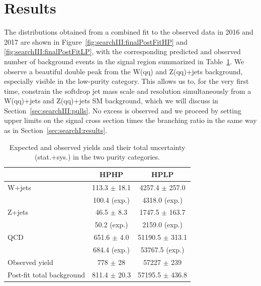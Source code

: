 \section{Results}
The distributions obtained from a combined fit to the observed data in 2016 and 2017 are shown in Figure~\ref{fig:searchIII:finalPostFitHP} and \ref{fig:searchIII:finalPostFitLP}, with the corresponding predicted and observed number of background events in the signal region summarized in Table~\ref{tab:searchIII:ObsEvents}. We observe a beautiful double peak from the W(qq) and Z(qq)+jets background, especially visible in the low-purity category. This allows us to, for the very first time, constrain the softdrop jet mass scale and resolution simultaneously from a W(qq)+jets and Z(qq)+jets SM background, which we will discuss in Section~\ref{sec:searchIII:pulls}. No excess is observed and we proceed by setting upper limits on the signal cross section times the branching ratio in the same way as in Section~\ref{sec:searchI:results}.
\begin{table}[h!]
\centering
\begin{tabular}{lcc} 
 & HPHP & HPLP\\
 \hline
 \hline
W+jets & 113.3 $\pm$ 18.1 & 4257.4 $\pm$ 257.0 \\
            & 100.4 (exp.) & 4318.0 (exp.)\\
Z+jets & 46.5 $\pm$ 8.3 & 1747.5 $\pm$ 163.7\\
           & 50.2 (exp.) & 2159.0 (exp.) \\
QCD  & 651.6 $\pm$ 4.0 & 51190.5 $\pm$ 313.1 \\
          & 684.4 (exp.) & 53767.5 (exp.) \\
\hline
Observed yield & 778 $\pm$ 28 & 57227 $\pm$ 239\\
Post-fit total background & 811.4 $\pm$ 20.3 & 57195.5 $\pm$ 436.8\\
\hline
\hline
\end{tabular} 
\caption{Expected and observed yields and their total uncertainty (stat.+sys.) in the two purity categories.} 
\label{tab:searchIII:ObsEvents}
\end{table}

